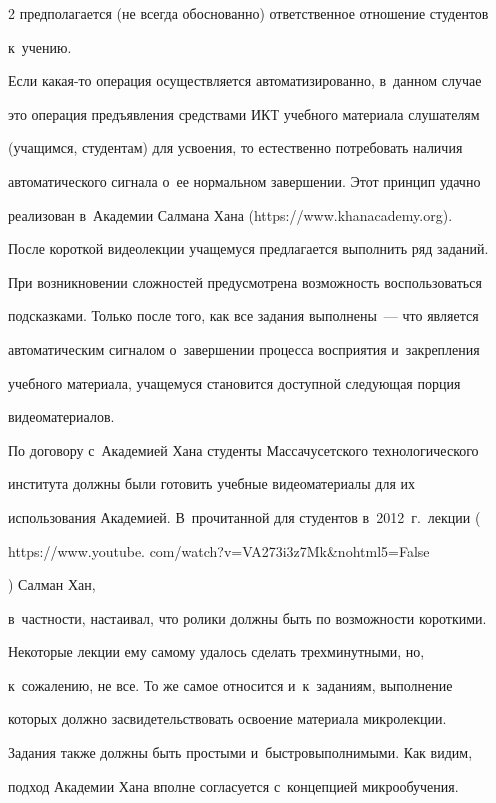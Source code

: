 \begin{multicols}{2}
предполагается (не всегда обоснованно) ответственное отношение студентов 


к~учению.


  


  Если какая-то операция осуществляется автоматизированно, в~данном случае 


это операция предъявления средствами ИКТ учебного материала слушателям 


(учащимся, студентам) для усвоения, то естественно потребовать наличия 


автоматического сигнала о~ее нормальном завершении. Этот принцип удачно 


реализован в~Академии Салмана Хана ({\sf https://www.khanacademy.org}). 


После короткой видеолекции учащемуся предлагается выполнить ряд заданий. 


При возникновении сложностей предусмотрена возможность воспользоваться 


подсказками. Только после того, как все задания выполнены~--- что является 


автоматическим сигналом о~завершении процесса восприятия и~закрепления 


учебного материала, учащемуся становится доступной следующая порция 


видеоматериалов. 


  


  По договору с~Академией Хана студенты Массачусетского технологического 


института должны были готовить учебные видеоматериалы для их 


использования Академией. В~прочитанной для студентов в~2012~г.\ лекции ({\sf 


https://www.youtube. com/watch?v=VA273i3z7Mk\&nohtml5=False}) Салман Хан, 


в~частности, настаивал, что ролики должны быть по возможности короткими. 


Некоторые лекции ему самому удалось сделать трехминутными, но, 


к~сожалению, не все. То же самое относится и~к~заданиям, выполнение 


которых должно засвидетельствовать освоение материала микролекции. 


Задания также должны быть прос\-ты\-ми и~быстровыполнимыми. Как видим, 


подход Академии Хана вполне согласуется с~концепцией микрообучения.



\end{multicols}
